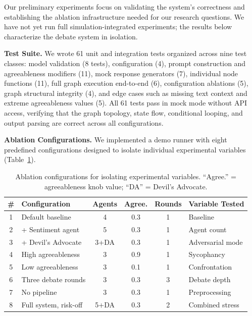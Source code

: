 Our preliminary experiments focus on validating the system's correctness and establishing the ablation infrastructure needed for our research questions. We have not yet run full simulation-integrated experiments; the results below characterize the debate system in isolation.

\textbf{Test Suite.}
We wrote 61 unit and integration tests organized across nine test classes: model validation (8 tests), configuration (4), prompt construction and agreeableness modifiers (11), mock response generators (7), individual node functions (11), full graph execution end-to-end (6), configuration ablations (5), graph structural integrity (4), and edge cases such as missing text context and extreme agreeableness values (5). All 61 tests pass in mock mode without API access, verifying that the graph topology, state flow, conditional looping, and output parsing are correct across all configurations.

\textbf{Ablation Configurations.}
We implemented a demo runner with eight predefined configurations designed to isolate individual experimental variables (Table~\ref{tab:ablation-configs}).

\begin{table}[h]
\centering
\small
\begin{tabular}{@{}clcccl@{}}
\toprule
\textbf{\#} & \textbf{Configuration} & \textbf{Agents} & \textbf{Agree.} & \textbf{Rounds} & \textbf{Variable Tested} \\
\midrule
1 & Default baseline         & 4 & 0.3 & 1 & Baseline \\
2 & + Sentiment agent        & 5 & 0.3 & 1 & Agent count \\
3 & + Devil's Advocate       & 3+DA & 0.3 & 1 & Adversarial mode \\
4 & High agreeableness       & 3 & 0.9 & 1 & Sycophancy \\
5 & Low agreeableness        & 3 & 0.1 & 1 & Confrontation \\
6 & Three debate rounds      & 3 & 0.3 & 3 & Debate depth \\
7 & No pipeline              & 3 & 0.3 & 1 & Preprocessing \\
8 & Full system, risk-off    & 5+DA & 0.3 & 2 & Combined stress \\
\bottomrule
\end{tabular}
\vspace{4pt}
\caption{Ablation configurations for isolating experimental variables. ``Agree.'' = agreeableness knob value; ``DA'' = Devil's Advocate.}
\label{tab:ablation-configs}
\end{table}

